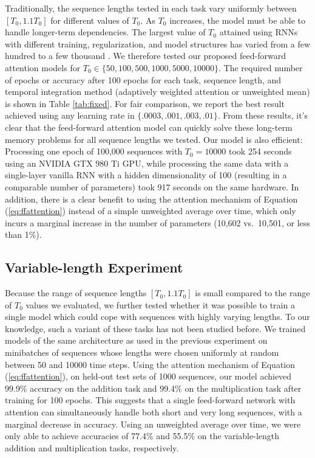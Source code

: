 \documentclass{article} %
\begin{document}
Traditionally, the sequence lengths tested in each task vary uniformly between $[T_0, 1.1T_0]$ for different values of $T_0$.
As $T_0$ increases, the model must be able to handle longer-term dependencies.
The largest value of $T_0$ attained using RNNs with different training, regularization, and model structures has varied from a few hundred \citep{martens2011learning,sutskever2013importance,le2015simple,krueger2015regularizing,arjovsky2015unitary} to a few thousand \citep{hochreiter1997long,jaegar2012long}.
We therefore tested our proposed feed-forward attention models for $T_0 \in \{50, 100, 500, 1000, 5000, 10000\}$.
The required number of epochs or accuracy after 100 epochs for each task, sequence length, and temporal integration method (adaptively weighted attention or unweighted mean) is shown in Table \ref{tab:fixed}.
For fair comparison, we report the best result achieved using any learning rate in $\{.0003, .001, .003, .01\}$.
From these results, it's clear that the feed-forward attention model can quickly solve these long-term memory problems for all sequence lengths we tested.
Our model is also efficient: Processing one epoch of 100,000 sequences with $T_0 = 10000$ took 254 seconds using an NVIDIA GTX 980 Ti GPU, while processing the same data with a single-layer vanilla RNN with a hidden dimensionality of 100 (resulting in a comparable number of parameters) took 917 seconds on the same hardware.
In addition, there is a clear benefit to using the attention mechanism of Equation (\ref{eq:ffattention}) instead of a simple unweighted average over time, which only incurs a marginal increase in the number of parameters (10,602 vs.\ 10,501, or less than 1\%).

\subsection{Variable-length Experiment}

Because the range of sequence lengths $[T_0, 1.1T_0]$ is small compared to the range of $T_0$ values we evaluated, we further tested whether it was possible to train a single model which could cope with sequences with highly varying lengths.
To our knowledge, such a variant of these tasks has not been studied before.
We trained models of the same architecture as used in the previous experiment on minibatches of sequences whose lengths were chosen uniformly at random between 50 and 10000 time steps.
Using the attention mechanism of Equation (\ref{eq:ffattention}), on held-out test sets of 1000 sequences, our model achieved 99.9\% accuracy on the addition task and 99.4\% on the multiplication task after training for 100 epochs.
This suggests that a single feed-forward network with attention can simultaneously handle both short and very long sequences, with a marginal decrease in accuracy.
Using an unweighted average over time, we were only able to achieve accuracies of 77.4\% and 55.5\% on the variable-length addition and multiplication tasks, respectively.
\end{document}

